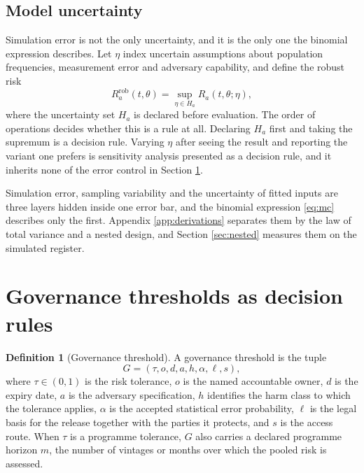 \documentclass[11pt,a4paper]{article}
\theoremstyle{plain}
\theoremstyle{definition}
\newtheorem{definition}{Definition}
\theoremstyle{definition}
\theoremstyle{plain}
\begin{document}
\subsection{Model uncertainty}

Simulation error is not the only uncertainty, and it is the only one the
binomial expression describes. Let $\eta$ index uncertain assumptions about population frequencies,
measurement error and adversary capability, and define the robust risk
\begin{equation}
R_a^{\mathrm{rob}}(t, \theta) = \sup_{\eta \in H_a} R_a(t, \theta; \eta) ,
\label{eq:rob}
\end{equation}
where the uncertainty set $H_a$ is declared before evaluation. The order of operations decides whether this is a rule at all. Declaring $H_a$
first and taking the supremum is a decision rule. Varying $\eta$ after seeing the result and reporting the
variant one prefers is sensitivity analysis presented as a decision rule, and
it inherits none of the error control in Section \ref{sec:gov}.

Simulation error, sampling variability and the uncertainty of fitted inputs
are three layers hidden inside one error bar, and the binomial expression
\eqref{eq:mc} describes only the first. Appendix \ref{app:derivations} separates
them by the law of total variance and a nested design, and Section
\ref{sec:nested} measures them on the simulated register.

\section{Governance thresholds as decision rules}\label{sec:gov}

\begin{definition}[Governance threshold]\label{def:thresh}
A governance threshold is the tuple
\begin{equation}
G = (\tau, o, d, a, h, \alpha, \ell, s) ,
\label{eq:tuple}
\end{equation}
where $\tau \in (0,1)$ is the risk tolerance, $o$ is the named accountable
owner, $d$ is the expiry date, $a$ is the adversary specification, $h$
identifies the harm class to which the tolerance applies, $\alpha$ is the
accepted statistical error probability, $\ell$ is the legal basis for the
release together with the parties it protects, and $s$ is the access route. When
$\tau$ is a programme tolerance, $G$ also carries a declared programme horizon
$m$, the number of vintages or months over which the pooled risk is assessed.
\end{definition}
\end{document}
